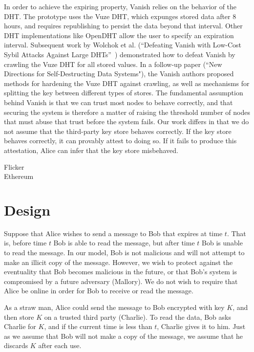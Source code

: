 \documentclass{article}
\begin{document}
In order to achieve the expiring property, Vanish relies on the behavior of the DHT. The prototype uses the Vuze DHT, which expunges stored data after 8 hours, and requires republishing to persist the data beyond that interval. Other DHT implementations like OpenDHT allow the user to specify an expiration interval.
Subsequent work by Wolchok et al. (``Defeating Vanish with Low-Cost Sybil Attacks Against Large DHTs''~\cite{defeat-vanish}) demonstrated how to defeat Vanish by crawling the Vuze DHT for all stored values. In a follow-up paper (``New Directions for Self-Destructing Data Systems"), the Vanish authors proposed methods for hardening the Vuze DHT against crawling, as well as mechanisms for splitting the key between different types of stores.
The fundamental assumption behind Vanish is that we can trust most nodes to behave correctly, and that securing the system is therefore a matter of raising the threshold number of nodes that must abuse that trust before the system fails. Our work differs in that we do not assume that the third-party key store behaves correctly. If the key store behaves correctly, it can provably attest to doing so. If it fails to produce this attestation, Alice can infer that the key store misbehaved.

Flicker~\cite{flicker,iso-tpm}\\

Ethereum~\cite{ethereum-white,ethereum-yellow}\\

\section{Design}

Suppose that Alice wishes to send a message to Bob that expires at time $t$. That is, before time $t$ Bob is able to read the message, but after time $t$ Bob is unable to read the message. In our model, Bob is not malicious and will not attempt to make an illicit copy of the message. However, we wish to protect against the eventuality that Bob becomes malicious in the future, or that Bob's system is compromised by a future adversary (Mallory). We do not wish to require that Alice be online in order for Bob to receive or read the message.

As a straw man, Alice could send the message to Bob encrypted with key $K$, and then store $K$ on a trusted third party (Charlie). To read the data, Bob asks Charlie for $K$, and if the current time is less than $t$, Charlie gives it to him. Just as we assume that Bob will not make a copy of the message, we assume that he discards $K$ after each use.
\end{document}
